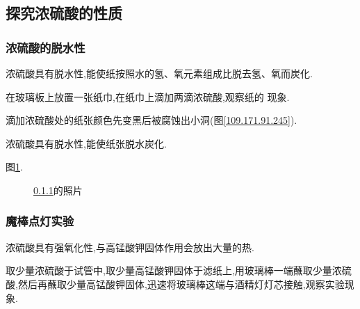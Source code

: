 \documentclass[hyperref,UTF8]{ctexart}
\begin{document}
\subsection{探究浓硫酸的性质}

\subsubsection{浓硫酸的脱水性} \label{135.149.167.66}

浓硫酸具有脱水性,能使纸按照水的氢、氧元素组成比脱去氢、氧而炭化.

在玻璃板上放置一张纸巾,在纸巾上滴加两滴浓硫酸,观察纸的
现象.

滴加浓硫酸处的纸张颜色先变黑后被腐蚀出小洞(图\ref{109.171.91.245}).

浓硫酸具有脱水性,能使纸张脱水炭化.

图\ref{254.80.103.3}.

\begin{figure}[h]
    \centering
    \caption{\ref{135.149.167.66}的照片}
    \label{254.80.103.3}
\end{figure}

\subsubsection{魔棒点灯实验}\label{158.14.36.238}

浓硫酸具有强氧化性,与高锰酸钾固体作用会放出大量的热.

取少量浓硫酸于试管中,取少量高锰酸钾固体于滤纸上,用玻璃棒一端蘸取少量浓硫酸,然后再蘸取少量高锰酸钾固体,迅速将玻璃棒这端与酒精灯灯芯接触,观察实验现象.
\end{document}
